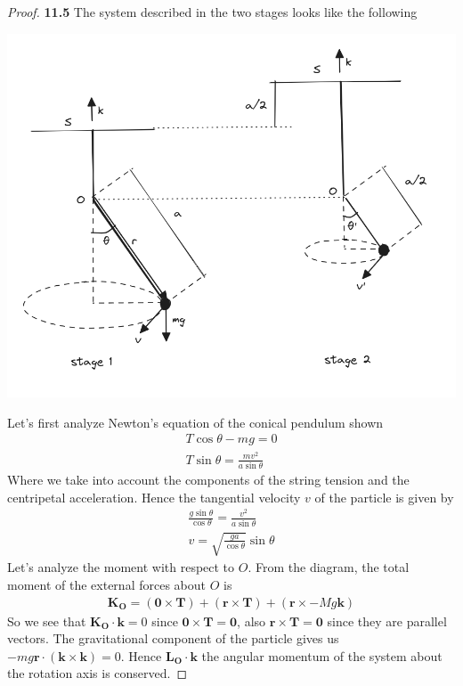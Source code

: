 \documentclass[11pt]{article}
\theoremstyle{definition}
\begin{document}
\begin{proof}{\textbf{11.5}}
    The system described in the two stages looks like the following
    \begin{center}
        \includegraphics[scale=0.48]{ch11-5.png}
    \end{center}
    Let's first analyze Newton's equation of the conical pendulum shown
    \begin{align*}
        T\cos\theta - mg = 0\\
        T\sin\theta = \frac{mv^2}{a\sin \theta}
    \end{align*}
    Where we take into account the components of the string tension and the 
    centripetal acceleration. Hence the tangential velocity $v$ of the particle
    is given by
    \begin{align*}
        \frac{g \sin\theta}{\cos\theta} = \frac{v^2}{a\sin \theta}\\
        v = \sqrt{\frac{ga}{\cos\theta}} \sin\theta
    \end{align*} 
    Let's analyze the moment with respect to $O$. From the diagram, the
    total moment of the external forces about $O$ is
    \begin{align*}
        \bm{K_O} = (\bm{0} \times \bm{T}) + (\bm{r} \times \bm{T})
        + (\bm{r} \times -Mg\bm{k})
    \end{align*}
    So we see that $\bm{K_O} \cdot \bm{k} = 0$ since
    $\bm{0} \times \bm{T} = \bm{0}$, also $\bm{r} \times \bm{T} = \bm{0}$
    since they are parallel vectors.
    The gravitational component of the particle gives us
    $-mg\bm{r} \cdot (\bm{k} \times \bm{k}) = 0$. Hence $\bm{L_O} \cdot \bm{k}$
    the angular momentum of the system about the rotation axis is conserved.
    

\end{proof}
\end{document}
